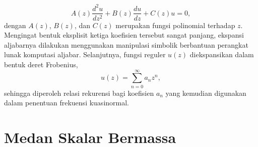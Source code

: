 \begin{equation} A(z)\frac{d^2u}{dz^2} + B(z)\frac{du}{dz} + C(z)u = 0, \end{equation}
dengan $A(z)$, $B(z)$, dan $C(z)$ merupakan fungsi polinomial terhadap $z$. Mengingat bentuk eksplisit ketiga koefisien tersebut sangat panjang, ekspansi aljabarnya dilakukan menggunakan manipulasi simbolik berbantuan perangkat lunak komputasi aljabar. Selanjutnya, fungsi reguler $u(z)$ diekspansikan dalam bentuk deret Frobenius,
\begin{equation} u(z) = \sum_{n=0}^{\infty} a_nz^n, \end{equation}
sehingga diperoleh relasi rekurensi bagi koefisien $a_n$ yang kemudian digunakan dalam penentuan frekuensi kuasinormal.

\section{Medan Skalar Bermassa}

